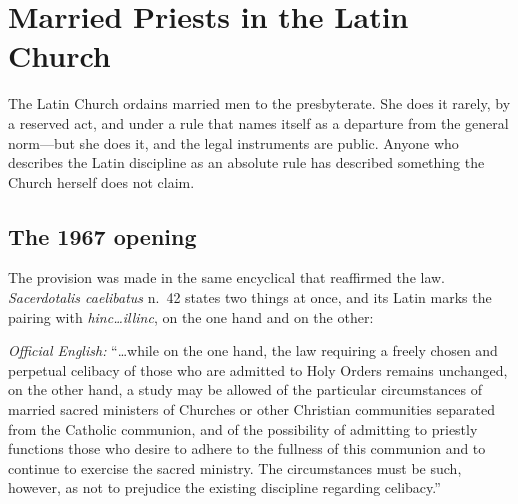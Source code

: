 \section{Married Priests in the Latin Church}

The Latin Church ordains married men to the presbyterate. She does it rarely, by a reserved act, and under a rule that names itself as a departure from the general norm---but she does it, and the legal instruments are public. Anyone who describes the Latin discipline as an absolute rule has described something the Church herself does not claim.

\subsection{The 1967 opening}

The provision was made in the same encyclical that reaffirmed the law. \emph{Sacerdotalis caelibatus} n.~42 states two things at once, and its Latin marks the pairing with \emph{hinc\ldots illinc}, on the one hand and on the other:

\begin{studyframe}

\emph{Official English:} ``\ldots while on the one hand, the law requiring a freely chosen and perpetual celibacy of those who are admitted to Holy Orders remains unchanged, on the other hand, a study may be allowed of the particular circumstances of married sacred ministers of Churches or other Christian communities separated from the Catholic communion, and of the possibility of admitting to priestly functions those who desire to adhere to the fullness of this communion and to continue to exercise the sacred ministry. The circumstances must be such, however, as not to prejudice the existing discipline regarding celibacy.''
\end{studyframe}

